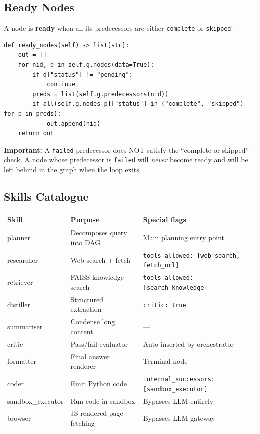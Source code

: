 \documentclass[12pt,a4paper]{article}
\begin{document}
\subsection{Ready Nodes}

A node is \textbf{ready} when all its predecessors are either
\texttt{complete} or \texttt{skipped}:

\begin{lstlisting}[style=pycode, caption={ready\_nodes() — flow.py}]
def ready_nodes(self) -> list[str]:
    out = []
    for nid, d in self.g.nodes(data=True):
        if d["status"] != "pending":
            continue
        preds = list(self.g.predecessors(nid))
        if all(self.g.nodes[p]["status"] in ("complete", "skipped") for p in preds):
            out.append(nid)
    return out
\end{lstlisting}

\begin{warnbox}
\textbf{Important:} A \texttt{failed} predecessor does NOT satisfy the
``complete or skipped'' check. A node whose predecessor is \texttt{failed}
will \emph{never} become ready and will be left behind in the graph when
the loop exits.
\end{warnbox}

\subsection{Skills Catalogue}

\begin{center}
\begin{tabular}{>{\ttfamily}p{3.5cm} p{4.5cm} p{5cm}}
\toprule
\normalfont\textbf{Skill} & \textbf{Purpose} & \textbf{Special flags} \\
\midrule
planner      & Decomposes query into DAG & Main planning entry point \\
researcher   & Web search + fetch        & \texttt{tools\_allowed: [web\_search, fetch\_url]} \\
retriever    & FAISS knowledge search    & \texttt{tools\_allowed: [search\_knowledge]} \\
distiller    & Structured extraction     & \texttt{critic: true} \\
summariser   & Condense long content     & --- \\
critic       & Pass/fail evaluator       & Auto-inserted by orchestrator \\
formatter    & Final answer renderer     & Terminal node \\
coder        & Emit Python code          & \texttt{internal\_successors: [sandbox\_executor]} \\
sandbox\_executor & Run code in sandbox  & Bypasses LLM entirely \\
browser      & JS-rendered page fetching & Bypasses LLM gateway \\
\bottomrule
\end{tabular}
\end{center}
\end{document}
